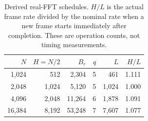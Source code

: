 \begin{table}[tb]
\centering
\begin{tabular}{@{}rrrrrr@{}}
\toprule
$N$ & $H=N/2$ & $B_r$ & $q$ & $L$ & $H/L$ \\
\midrule
1,024 & 512 & 2,304 & 5 & 461 & 1.111 \\
2,048 & 1,024 & 5,120 & 5 & 1,024 & 1.000 \\
4,096 & 2,048 & 11,264 & 6 & 1,878 & 1.091 \\
16,384 & 8,192 & 53,248 & 7 & 7,607 & 1.077 \\
\bottomrule
\end{tabular}
\caption{Derived real-FFT schedules. $H/L$ is the actual frame rate divided by the nominal rate when a new frame starts immediately after completion. These are operation counts, not timing measurements.}
\label{tab:cadence}
\end{table}
